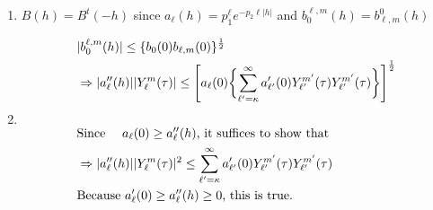 \documentclass[11pt]{article}
\begin{document}
\begin{itemize}
\begin{enumerate}
\item
$B(h)=B^t(-h)$ since $a_\ell(h)=p_1^\ell e^{-p_2 \ell |h|}$ and $b_{0}^{\ell,m}(h) = b_{\ell,m}^{0}(h)$\\

\item
\begin{align*}
&|b_{0}^{\ell,m}(h)| \le \{b_{0}(0) b_{\ell,m}(0)\}^\frac{1}{2}\\
&\Rightarrow |a''_{\ell}(h)||Y_{\ell}^{m}(\tau)| \le \Biggl[ a_{\ell}(0) \biggl\{ \sum_{{\ell}'=\kappa}^{\infty} a'_{{\ell}'}(0) Y_{{\ell}'}^{{m}'}(\tau) Y_{{\ell}'}^{{m}'}(\tau) \biggl\} \Biggl]^\frac{1}{2}\\
\\
&\text{Since \quad $a_{\ell}(0) \ge a''_{\ell}(h)$, it suffices to show that }\\
&\Rightarrow |a''_{\ell}(h)||Y_{\ell}^{m}(\tau)|^2 \le \sum_{{\ell}'=\kappa}^{\infty} a'_{{\ell}'}(0) Y_{{\ell}'}^{{m}'}(\tau) Y_{{\ell}'}^{{m}'}(\tau)\\
&\text{Because $a'_\ell(0) \ge a''_\ell(h)  \ge 0$, this is true.}\\
\end{align*}


\end{enumerate}
\end{itemize}
\end{document}
